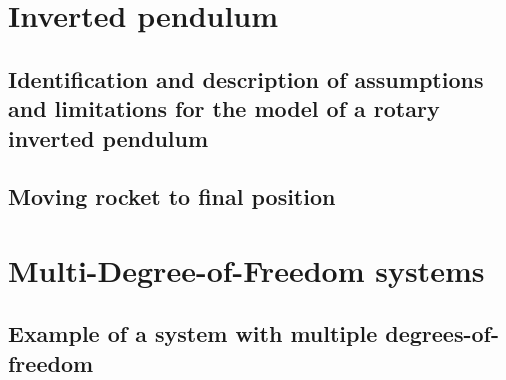 \documentclass[11pt]{article}
\numberwithin{equation}{section}
\begin{document}
\section{Inverted pendulum}
\subsection{Identification and description of assumptions and limitations for the model of a rotary inverted pendulum}
\subsection{Moving rocket to final position}
\section{Multi-Degree-of-Freedom systems}
\subsection{Example of a system with multiple degrees-of-freedom}


\end{document}
